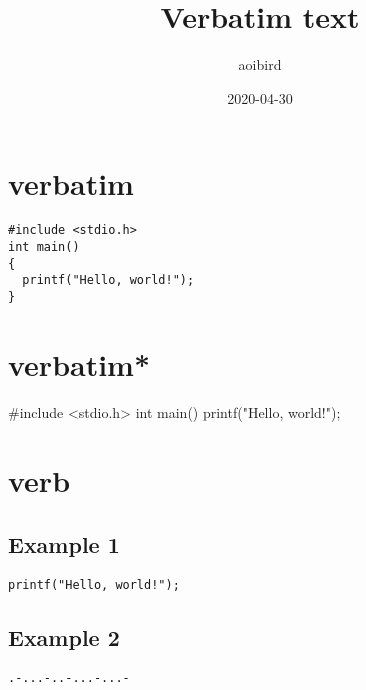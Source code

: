 \documentclass{article}
\title{Verbatim text}
\author{aoibird}
\date{2020-04-30}
\begin{document}
\maketitle

\section{verbatim}
\begin{verbatim}
#include <stdio.h>
int main()
{
  printf("Hello, world!");
}
\end{verbatim}

\section{verbatim*}
\begin{verbatim*}
#include <stdio.h>
int main()
{
  printf("Hello, world!");
}
\end{verbatim*}

\section{verb}

\subsection{Example 1}
\verb+printf("Hello, world!");+

\subsection{Example 2}
\verb|.-...-..-...-...-|
\end{document}

